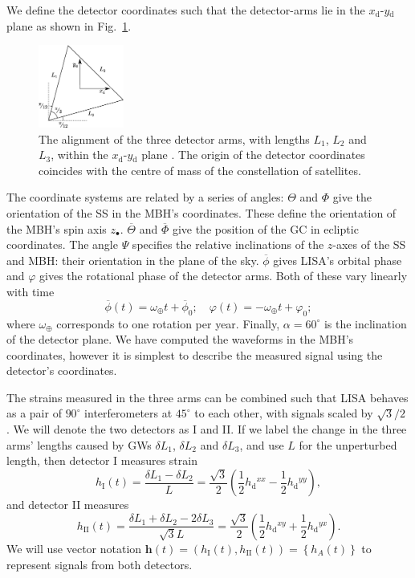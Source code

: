 \documentclass[useAMS,usedcolumn,usegraphicx,usenatbib]{mn2e}
\newcommand{\figref}[1]{Fig.~\ref{fig:#1}}
\newcommand{\sub}[1]{\ensuremath{_\mathrm{#1}}}
\newcommand{\recip}[1]{\ensuremath{\frac{1}{#1}}}
\begin{document}
We define the detector coordinates such that the detector-arms lie in the $x\sub{d}$-$y\sub{d}$ plane as shown in \figref{LISA_arms}.
\begin{figure}
\begin{center}
 \includegraphics[width=0.25\textwidth]{LISA_arms.eps}
    \caption{The alignment of the three detector arms, with lengths $L_1$, $L_2$ and $L_3$, within the $x\sub{d}$-$y\sub{d}$ plane \citep{Cutler1998}. The origin of the detector coordinates coincides with the centre of mass of the constellation of satellites.}
   \label{fig:LISA_arms}
\end{center}
\end{figure}
The coordinate systems are related by a series of angles: $\Theta$ and $\Phi$ give the orientation of the SS in the MBH's coordinates. These define the orientation of the MBH's spin axis $z_\bullet$. $\overline{\Theta}$ and $\overline{\Phi}$ give the position of the GC in ecliptic coordinates. The angle $\Psi$ specifies the relative inclinations of the $z$-axes of the SS and MBH: their orientation in the plane of the sky. $\overline{\phi}$ gives LISA's orbital phase and $\varphi$ gives the rotational phase of the detector arms. Both of these vary linearly with time
\begin{equation}
\overline{\phi}(t) = \omega_\oplus t + \overline{\phi}_0; \quad \varphi(t) = -\omega_\oplus t + \varphi_0;
\end{equation}
where $\omega_\oplus$ corresponds to one rotation per year. Finally, $\alpha = 60^{\circ}$ is the inclination of the detector plane. We have computed the waveforms in the MBH's coordinates, however it is simplest to describe the measured signal using the detector's coordinates.

The strains measured in the three arms can be combined such that LISA behaves as a pair of $90^{\circ}$ interferometers at $45^{\circ}$ to each other, with signals scaled by ${\sqrt{3}}/{2}$ \citep{Cutler1998}. We will denote the two detectors as I and II. If we label the change in the three arms' lengths caused by GWs $\delta L_1$, $\delta L_2$ and $\delta L_3$, and use $L$ for the unperturbed length, then detector I measures strain
\begin{equation}
h\sub{I}(t) = \frac{\delta L_1 - \delta L_2}{L} = \frac{\sqrt{3}}{2}\left(\recip{2} h\sub{d}^{xx} - \recip{2}h\sub{d}^{yy}\right),
\end{equation}
and detector II measures
\begin{equation}
h\sub{II}(t) = \frac{\delta L_1 + \delta L_2 - 2 \delta L_3}{\sqrt{3}L} = \frac{\sqrt{3}}{2}\left(\recip{2} h\sub{d}^{xy} + \recip{2} h\sub{d}^{yx}\right).
\end{equation}
We will use vector notation $\boldsymbol{h}(t) = \left(h\sub{I}(t), h\sub{II}(t)\right) = \left\{h_A(t)\right\}$ to represent signals from both detectors.
\end{document}
